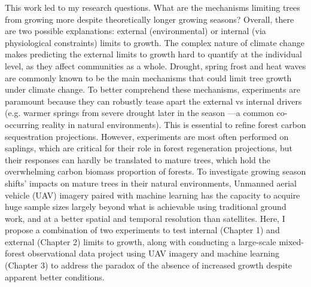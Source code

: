 \documentclass[12pt]{article}
\begin{document}
This work led to my research questions. What are the mechanisms limiting trees from growing more despite theoretically longer growing seasons? Overall, there are two possible explanations: external (environmental) or internal (via physiological constraints) limits to growth. The complex nature of climate change makes predicting the external limits to growth hard to quantify at the individual level, as they affect communities as a whole. Drought, spring frost and heat waves are commonly known to be the main mechanisms that could limit tree growth under climate change. To better comprehend these mechanisms, experiments are paramount because they can robustly tease apart the external vs internal drivers (e.g. warmer springs from severe drought later in the season ---a common co-occurring reality in natural environments). This is essential to refine forest carbon sequestration projections. However, experiments are most often performed on saplings, which are critical for their role in forest regeneration projections, but their responses can hardly be translated to mature trees, which hold the overwhelming carbon biomass proportion of forests. To investigate growing season shifts' impacts on mature trees in their natural environments, Unmanned aerial vehicle (UAV) imagery paired with machine learning has the capacity to acquire huge sample sizes largely beyond what is achievable using traditional ground work, and at a better spatial and temporal resolution than satellites. Here, I propose a combination of two experiments to test internal (Chapter 1) and external (Chapter 2) limits to growth, along with conducting a large-scale mixed-forest observational data project using UAV imagery and machine learning (Chapter 3) to address the paradox of the absence of increased growth despite apparent better conditions.
\end{document}
